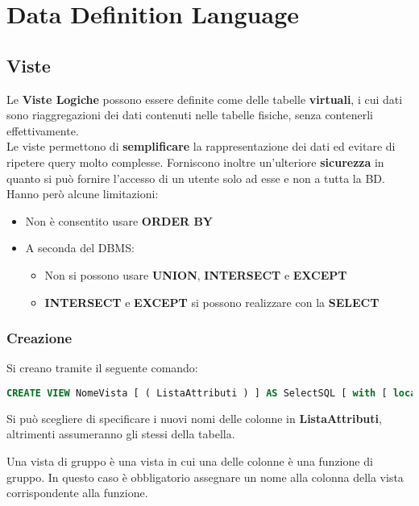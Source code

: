 \newpage
\section{Data Definition Language}
\subsection{Viste}
Le \textbf{Viste Logiche} possono essere definite come delle tabelle \textbf{virtuali}, i cui dati sono riaggregazioni dei dati contenuti nelle tabelle fisiche, senza contenerli effettivamente.\\
Le viste permettono di \textbf{semplificare} la rappresentazione dei dati ed evitare di ripetere query molto complesse. Forniscono inoltre un'ulteriore \textbf{sicurezza} in quanto si può fornire l'accesso di un utente solo ad esse e non a tutta la BD.\\
Hanno però alcune limitazioni:
\begin{itemize}
	\item Non è consentito usare \textbf{ORDER BY}
	\item A seconda del DBMS:
	\begin{itemize}
		\item Non si possono usare \textbf{UNION}, \textbf{INTERSECT} e \textbf{EXCEPT}
		\item \textbf{INTERSECT} e \textbf{EXCEPT} si possono realizzare con la \textbf{SELECT}
	\end{itemize}
\end{itemize}

\subsubsection{Creazione}
Si creano tramite il seguente comando:
\begin{lstlisting}[language=SQL]
	CREATE VIEW NomeVista [ ( ListaAttributi ) ] AS SelectSQL [ with [ local | cascaded ] check option ]
\end{lstlisting}
Si può scegliere di specificare i nuovi nomi delle colonne in \textbf{ListaAttributi}, altrimenti assumeranno gli stessi della tabella.

\begin{observation}
	Una vista di gruppo è una vista in cui una delle colonne è una funzione di gruppo. In questo caso è obbligatorio assegnare un nome alla colonna della vista corrispondente alla funzione.
\end{observation}

